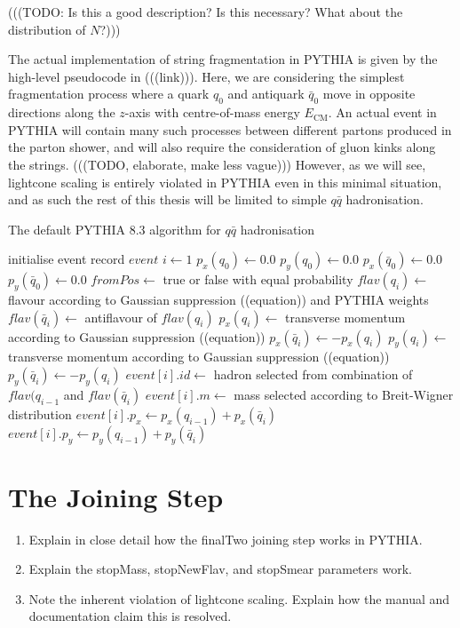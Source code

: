 \documentclass[12pt,a4paper]{report}
\begin{document}
(((TODO: Is this a good description? Is this necessary? What about the distribution of $N$?)))

The actual implementation of string fragmentation in PYTHIA is given by the high-level pseudocode in (((link))). Here, we are considering the simplest fragmentation process where a quark $q_0$ and antiquark $\bar{q}_0$ move in opposite directions along the $z$-axis with centre-of-mass energy $E_\text{CM}$. An actual event in PYTHIA will contain many such processes between different partons produced in the parton shower, and will also require the consideration of gluon kinks along the strings. (((TODO, elaborate, make less vague))) However, as we will see, lightcone scaling is entirely violated in PYTHIA even in this minimal situation, and as such the rest of this thesis will be limited to simple $q \bar{q}$ hadronisation.

\begin{algorithm}
  \caption{The default PYTHIA 8.3 algorithm for $q\bar{q}$ hadronisation} \label{alg:default}
  \begin{algorithmic}
    \State initialise event record $event$
    \State $i \gets 1$
    \State $p_x(q_0) \gets 0.0$
    \State $p_y(q_0) \gets 0.0$
    \State $p_x(\bar{q}_0) \gets 0.0$
    \State $p_y(\bar{q}_0) \gets 0.0$
    \Loop
    \State $fromPos \gets$ true or false with equal probability
    \State $flav(q_i) \gets$ flavour according to Gaussian suppression ((equation)) and PYTHIA weights
    \State $flav(\bar{q}_i) \gets$ antiflavour of $flav(q_i)$
    \State $p_x(q_i) \gets$ transverse momentum according to Gaussian suppression ((equation))
    \State $p_x(\bar{q}_i) \gets -p_x(q_i)$
    \State $p_y(q_i) \gets$ transverse momentum according to Gaussian suppression ((equation))
    \State $p_y(\bar{q}_i) \gets -p_y(q_i)$ 
    \State $event[i].id \gets$ hadron selected from combination of $flav(q_{i-1}$ and $flav(\bar{q}_i)$
    \State $event[i].m \gets$ mass selected according to Breit-Wigner distribution
    \State $event[i].p_x \gets p_x(q_{i-1}) + p_x(\bar{q}_i)$
    \State $event[i].p_y \gets p_y(q_{i-1}) + p_y(\bar{q}_i)$
    \Else
    \EndIf
    \EndLoop
    \EndProcedure
  \end{algorithmic}
\end{algorithm}

\section{The Joining Step}
\begin{enumerate}
\item Explain in close detail how the finalTwo joining step works in PYTHIA.
\item Explain the stopMass, stopNewFlav, and stopSmear parameters work.
\item Note the inherent violation of lightcone scaling. Explain how the manual and documentation claim this is resolved.
\end{enumerate}
\end{document}
